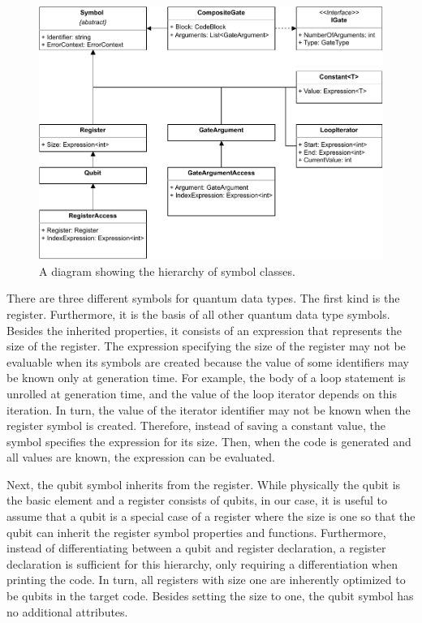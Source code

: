 \begin{figure}[htp]
    \centering
    \includegraphics[width=.9\textwidth]{../figures/drawio/uml_symbols.pdf}
    \caption{A diagram showing the hierarchy of symbol classes.}
    \label{fig:implementation_uml_symbols}
\end{figure}

There are three different symbols for quantum data types. The first kind is the register. Furthermore, it is the basis of all other quantum data type symbols. Besides the inherited properties, it consists of an expression that represents the size of the register. The expression specifying the size of the register may not be evaluable when its symbols are created because the value of some identifiers may be known only at generation time.
For example, the body of a loop statement is unrolled at generation time, and the value of the loop iterator depends on this iteration. In turn, the value of the iterator identifier may not be known when the register symbol is created. Therefore, instead of saving a constant value, the symbol specifies the expression for its size. Then, when the code is generated and all values are known, the expression can be evaluated.

Next, the qubit symbol inherits from the register. While physically the qubit is the basic element and a register consists of qubits, in our case, it is useful to assume that a qubit is a special case of a register where the size is one so that the qubit can inherit the register symbol properties and functions. Furthermore, instead of differentiating between a qubit and register declaration, a register declaration is sufficient for this hierarchy, only requiring a differentiation when printing the code. In turn, all registers with size one are inherently optimized to be qubits in the target code. Besides setting the size to one, the qubit symbol has no additional attributes.

